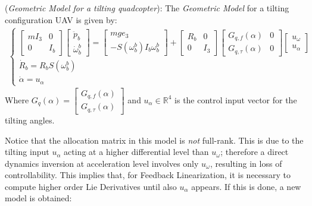 \begin{definition}\label{UAV_tilting_geometric_model_def}
    (\textit{Geometric Model for a tilting quadcopter}): The \textit{Geometric Model} for a tilting configuration UAV is given by:
    \small{
    \begin{gather}\label{UAV_tilting_geometric_model}
        \begin{cases}
            \begin{bmatrix}
                mI_3 & 0 \\ 0 & I_b
            \end{bmatrix}
            \begin{bmatrix}
                \ddot{p}_b\\
                \dot{\omega}_b^b
            \end{bmatrix}=
            \begin{bmatrix}
                mge_3\\
                -S\left(\omega_b^b\right)I_b\omega_b^b
            \end{bmatrix}+
            \begin{bmatrix}
                R_b & 0 \\ 0 & I_3
            \end{bmatrix}
            \begin{bmatrix}
                G_{q,f}(\alpha) & 0\\
                G_{q,\tau}(\alpha) & 0
            \end{bmatrix}
            \begin{bmatrix}
                u_\omega\\ u_\alpha
            \end{bmatrix}\\
            \dot{R}_b=R_bS\left(\omega_b^b\right)\\ 
            \dot{\alpha}=u_\alpha
        \end{cases}
    \end{gather} }                
    Where $G_q(\alpha)=\begin{bmatrix}G_{q,f}(\alpha) \\ G_{q,\tau}(\alpha)\end{bmatrix}$ and $u_\alpha \in \mathbb{R}^4$ is the control input vector for the tilting angles.
\end{definition}
Notice that the allocation matrix in this model is \textit{not} full-rank. This is due to the tilting input $u_\alpha$ acting at a higher differential level than $u_\omega$; therefore a direct dynamics inversion at acceleration level involves only $u_\omega$, resulting in loss of controllability. This implies that, for Feedback Linearization, it is necessary to compute higher order Lie Derivatives until also $u_\alpha$ appears. If this is done, a new model is obtained:
